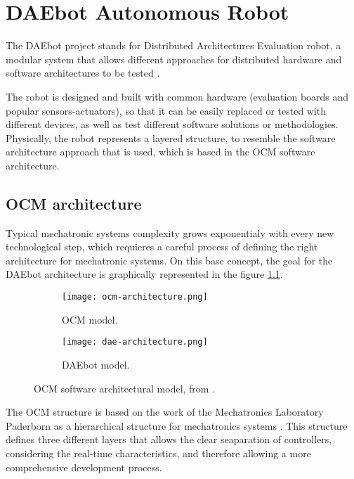 
\chapter{DAEbot Autonomous Robot}

The DAEbot project stands for Distributed Architectures Evaluation robot, a modular system that allows different approaches for distributed hardware and software architectures to be tested \cite{Wiki}.

The robot is designed and built with common hardware (evaluation boards and popular sensors-actuators), so that it can be easily replaced or tested with different devices, as well as test different software solutions or methodologies. Physically, the robot represents a layered structure, to resemble the software architecture approach that is used, which is based in the OCM software architecture.

\section{OCM architecture}

Typical mechatronic systems complexity grows exponentialy with every new technological step, which requieres a careful process of defining the right architecture for mechatronic systems. On this base concept, the goal for the DAEbot architecture is graphically represented in the figure \ref{fig:ocm-architecture}.

\begin{figure}[htp]
	\centering
	\begin{subfigure}{0.45\textwidth}
		\texttt{[image: ocm-architecture.png]}
		\caption{OCM model.} \label{fig:ocm-architecture}
	\end{subfigure} \hfill
	\begin{subfigure}{0.45\textwidth}
		\texttt{[image: dae-architecture.png]}
		\caption{DAEbot model.} \label{fig:dae-architecture}
	\end{subfigure}%
	\caption{OCM software architectural model, from \cite{Wiki}.} \label{fig:ocm-dae}
\end{figure}%

The OCM structure is based on the work of the Mechatronics Laboratory Paderborn as a hierarchical structure for mechatronics systems \cite{Lueckel2001}. This structure defines three different layers that allows the clear seaparation of controllers, considering the real-time characteristics, and therefore allowing a more comprehensive development process.

